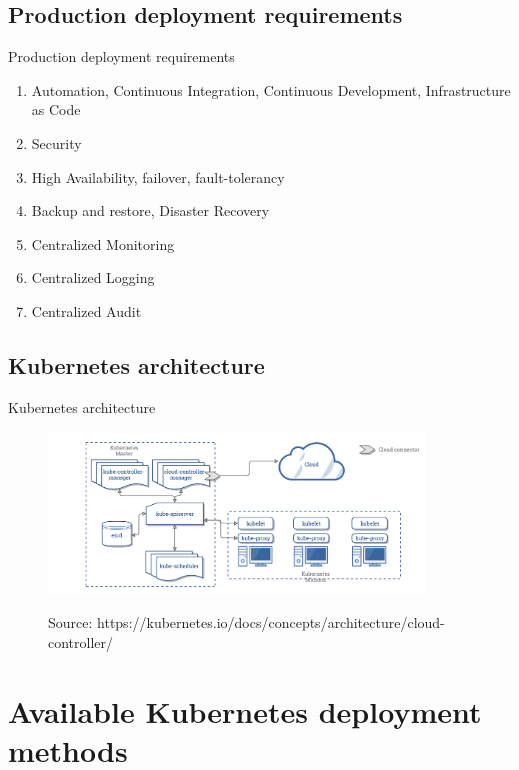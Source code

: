 \documentclass{beamer}
\newcommand{\source}[1]{\caption*{Source: {#1}} }
\begin{document}
\subsection{Production deployment requirements}
\begin{frame}{Production deployment requirements}%
\begin{enumerate}
	\item Automation, Continuous Integration, Continuous Development, Infrastructure as Code
	\item Security
	\item High Availability, failover, fault-tolerancy
	\item Backup and restore, Disaster Recovery
	\item Centralized Monitoring
	\item Centralized Logging
	\item Centralized Audit
\end{enumerate}
\end{frame}

\subsection{Kubernetes architecture}
\begin{frame}{Kubernetes architecture}%
\begin{figure}
	\includegraphics[width=10cm]{figures/k8s-arch.png}
	\label{fig:k8s-arch}
	\source{https://kubernetes.io/docs/concepts/architecture/cloud-controller/}
\end{figure}
\end{frame}

\section{Available Kubernetes deployment methods}
\end{document}
